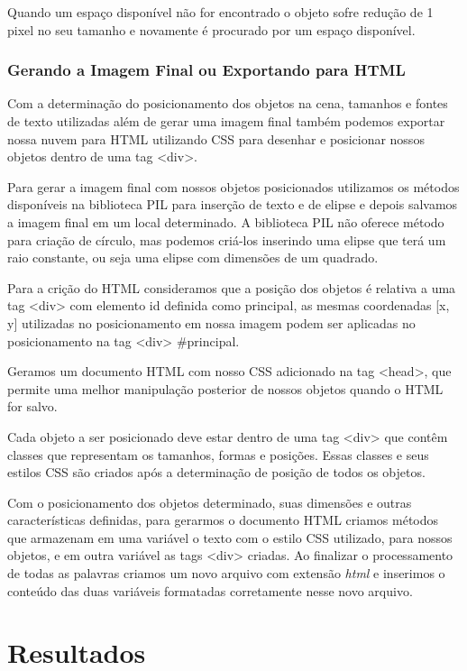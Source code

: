\documentclass[12pt]{article}
\begin{document}
Quando um espaço disponível não for encontrado o objeto sofre redução de 1 pixel no seu tamanho e novamente é procurado por um espaço disponível.

\subsubsection{Gerando a Imagem Final ou Exportando para HTML}

Com a determinação do posicionamento dos objetos na cena, tamanhos e fontes de texto utilizadas além de gerar uma imagem final também podemos exportar nossa nuvem para HTML utilizando CSS para desenhar e posicionar nossos objetos dentro de uma tag <div>.

Para gerar a imagem final com nossos objetos posicionados utilizamos os métodos disponíveis na biblioteca PIL para inserção de texto e de elipse e depois salvamos a imagem final em um local determinado. A biblioteca PIL não oferece método para criação de círculo, mas podemos criá-los inserindo uma elipse que terá um raio constante, ou seja uma elipse com dimensões de um quadrado.

Para a crição do HTML consideramos que a posição dos objetos é relativa a uma tag <div> com elemento id definida como principal, as mesmas coordenadas [x, y] utilizadas no posicionamento em nossa imagem podem ser aplicadas no posicionamento na tag <div> \#principal.

Geramos um documento HTML com nosso CSS adicionado na tag <head>, que permite uma melhor manipulação posterior de nossos objetos quando o HTML for salvo.

Cada objeto a ser posicionado deve estar dentro de uma tag <div> que contêm classes que representam os tamanhos, formas e posições. Essas classes e seus estilos CSS são criados após a determinação de posição de todos os objetos.

Com o posicionamento dos objetos determinado, suas dimensões e outras características definidas, para gerarmos o documento HTML criamos métodos que armazenam em uma variável o texto com o estilo CSS utilizado, para nossos objetos, e em outra variável as tags <div> criadas. Ao finalizar o processamento de todas as palavras criamos um novo arquivo com extensão \textit{html} e inserimos o conteúdo das duas variáveis formatadas corretamente nesse novo arquivo. 


\section{Resultados}
\end{document}
